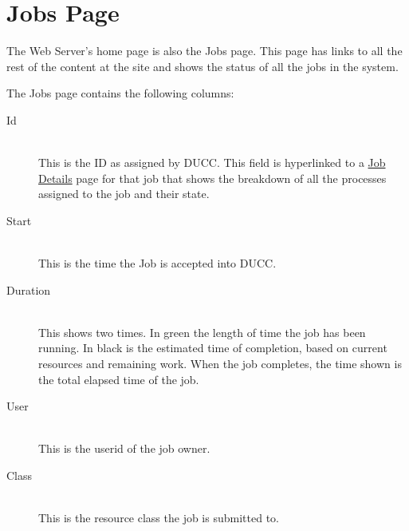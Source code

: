 
    \section{Jobs Page}
        The Web Server's home page is also the Jobs page. This page has links to all the rest of the content 
        at the site and shows the status of all the jobs in the system. 
    
        The Jobs page contains the following columns: 

        \begin{description}

            \item[Id] \hfill \\
              This is the ID as assigned by DUCC. This field is hyperlinked to a
              \hyperref[sec:ws-job-details]{Job Details} page for that job that shows the breakdown of
              all the processes assigned to the job and their state.
              
            \item[Start] \hfill \\
              This is the time the Job is accepted into DUCC.
              
            \item[Duration] \hfill \\
              This shows two times.  In green the length of time the job has been running.  In black is
              the estimated time of completion, based on current resources and remaining work.  When
              the job completes, the time shown is the total elapsed time of the job.
                            
            \item[User] \hfill \\
              This is the userid of the job owner.
              
            \item[Class] \hfill \\
              This is the resource class the job is submitted to.
              

\end{description}
